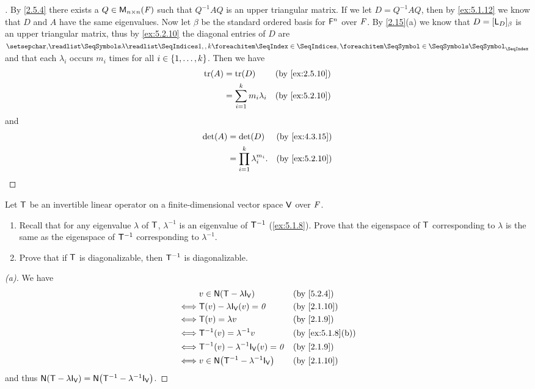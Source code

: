 \begin{proof}[]
	By \cref{2.5.4} there exists a \(Q \in \mathsf{M}_{{n} \times n}({\mathit{F}})\) such that \(Q^{-1} A Q\) is an upper triangular matrix.
	If we let \(D = Q^{-1} A Q\), then by \cref{ex:5.1.12} we know that \(D\) and \(A\) have the same eigenvalues.
	Now let \(\beta\) be the standard ordered basis for \(\mathsf{F}^n\) over \(\mathit{F}\).
	By \cref{2.15}(a) we know that \(D = [\mathsf{L}_D]_{\beta}\) is an upper triangular matrix, thus by \cref{ex:5.2.10} the diagonal entries of \(D\) are \(\seq{\lambda}{1,,k}\) and that each \(\lambda_i\) occurs \(m_i\) times for all \(i \in \left\lbrace1, \dots, k\right\rbrace\).
	Then we have
	\begin{align*}
		\tr(A) & = \tr(D)                       &  & \by{ex:2.5.10} \\
		       & = \sum_{i = 1}^k m_i \lambda_i &  & \by{ex:5.2.10}
	\end{align*}
	and
	\begin{align*}
		\det(A) & = \det(D)                          &  & \by{ex:4.3.15} \\
		        & = \prod_{i = 1}^k \lambda_i^{m_i}. &  & \by{ex:5.2.10}
	\end{align*}
\end{proof}

\begin{ex}\label{ex:5.2.12}
	Let \(\mathsf{T}\) be an invertible linear operator on a finite-dimensional vector space \(\mathsf{V}\) over \(\mathit{F}\).
	\begin{enumerate}
		\item Recall that for any eigenvalue \(\lambda\) of \(\mathsf{T}\), \(\lambda^{-1}\) is an eigenvalue of \(\mathsf{T}^{-1}\) (\cref{ex:5.1.8}).
		      Prove that the eigenspace of \(\mathsf{T}\) corresponding to \(\lambda\) is the same as the eigenspace of \(\mathsf{T}^{-1}\) corresponding to \(\lambda^{-1}\).
		\item Prove that if \(\mathsf{T}\) is diagonalizable, then \(\mathsf{T}^{-1}\) is diagonalizable.
	\end{enumerate}
\end{ex}

\begin{proof}[(a)]
	We have
	\begin{align*}
		     & v \in \ns{\T - \lambda \IT[\V]}            &  & \by{5.2.4}       \\
		\iff & \T(v) - \lambda \IT[\V](v) = \zv           &  & \by{2.1.10}      \\
		\iff & \T(v) = \lambda v                          &  & \by{2.1.9}       \\
		\iff & \T^{-1}(v) = \lambda^{-1} v                &  & \by{ex:5.1.8}[b] \\
		\iff & \T^{-1}(v) - \lambda^{-1} \IT[\V](v) = \zv &  & \by{2.1.9}       \\
		\iff & v \in \ns{\T^{-1} - \lambda^{-1} \IT[\V]}  &  & \by{2.1.10}
	\end{align*}
	and thus \(\ns{\T - \lambda \IT[\V]} = \ns{\T^{-1} - \lambda^{-1} \IT[\V]}\).
\end{proof}


